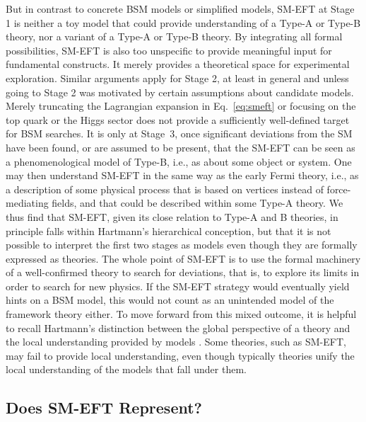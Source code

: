 But in contrast to concrete BSM models or simplified models, SM-EFT at Stage 1 is neither a toy model \citep[see][]{Reutlinger2018} that could provide understanding of a Type-A or Type-B theory, nor a variant of a Type-A or Type-B theory. 
By integrating all formal possibilities, SM-EFT is also too unspecific to provide meaningful input for fundamental constructs. 
It merely provides a theoretical space for experimental exploration.
Similar arguments apply for Stage 2, at least in general and unless going to Stage 2 was motivated by certain assumptions about candidate models.
Merely truncating the Lagrangian expansion in Eq.~\ref{eq:smeft} or focusing on the top quark or the Higgs sector does not provide a sufficiently well-defined target for BSM searches.
It is only at Stage~3, once significant deviations from the SM have been found, or are assumed to be present, that the SM-EFT can be seen as
a phenomenological model of Type-B, i.e., as about some object or system.
One may then understand SM-EFT in the same way as the early Fermi theory, i.e., as a description of some physical process that is based on vertices instead of force-mediating fields, and that could be described within some Type-A theory.
We thus find that SM-EFT, given its close relation to Type-A and B theories, in principle falls within Hartmann's hierarchical conception, but that it is not possible to interpret the first two stages as models even though they are formally expressed as theories.
The whole point of SM-EFT is to use the formal machinery of a well-confirmed theory to search for deviations, that is, to explore its limits in order to search for new physics. 
If the SM-EFT strategy would eventually yield hints on a BSM model, this would not count as an unintended model of the framework theory either.
To move forward from this mixed outcome, it is helpful to recall Hartmann's distinction between the global perspective of a theory and the local understanding provided by models \citep{hartmann2001}. 
Some theories, such as SM-EFT, may fail to provide local understanding, even though typically theories unify the local understanding of the models that fall under them.


\subsection{Does SM-EFT Represent?}
\label{sub:smeftrep} 

